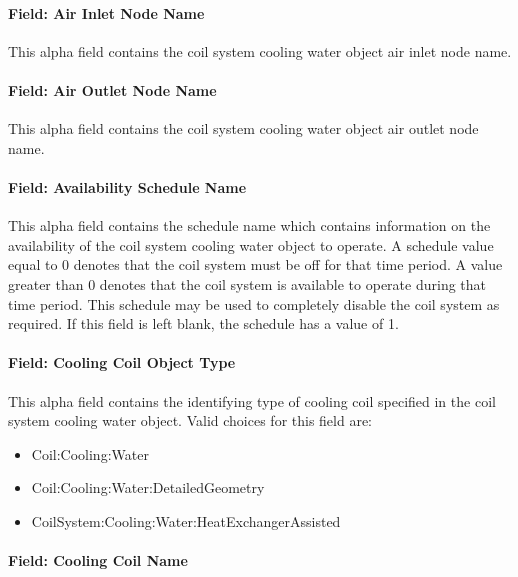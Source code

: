 \paragraph{Field: Air Inlet Node Name}\label{field-air-inlet-node-name-01}

This alpha field contains the coil system cooling water object air inlet node name.

\paragraph{Field: Air Outlet Node Name}\label{field-air-outlet-node-name-01}

This alpha field contains the coil system cooling water object air outlet node name.

\paragraph{Field: Availability Schedule Name}

This alpha field contains the schedule name which contains information on the availability of the coil system cooling water object to operate. A schedule value equal to 0 denotes that the coil system must be off for that time period. A value greater than 0 denotes that the coil system is available to operate during that time period. This schedule may be used to completely disable the coil system as required. If this field is left blank, the schedule has a value of 1.

\paragraph{Field: Cooling Coil Object Type}\label{field-cooling-coil-object-type-01}

This alpha field contains the identifying type of cooling coil specified in the coil system cooling water object. Valid choices for this field are:
\begin{itemize}
\item Coil:Cooling:Water
\item Coil:Cooling:Water:DetailedGeometry
\item CoilSystem:Cooling:Water:HeatExchangerAssisted
\end{itemize}


\paragraph{Field: Cooling Coil Name}\label{field-cooling-coil-name-01}

